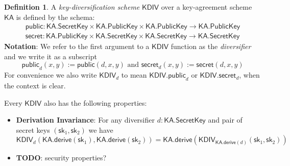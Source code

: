 \documentclass[a4paper]{article}
\newcommand{\TODO}[1]{{\color{red}\textbf{TODO}}: #1}
\theoremstyle{definition}
\newtheorem{definition}{Definition}[subsection]
\newcommand{\KA}{{\textsf{KA}}}
\newcommand{\KDIV}{{\textsf{KDIV}}}
\newcommand{\PublicKey}{{\textsf{PublicKey}}}
\newcommand{\SecretKey}{{\textsf{SecretKey}}}
\newcommand{\derive}{{\textsf{derive}}}
\newcommand{\public}{{\textsf{public}}}
\newcommand{\secret}{{\textsf{secret}}}
\newcommand{\sk}{{\textsf{sk}}}
\begin{document}
\begin{definition}
    A \emph{key-diversification scheme} $\KDIV$ over a key-agreement scheme $\KA$ is defined by the schema:
    \begin{align*}
        \public : \KA.\SecretKey \times \KA.\PublicKey \times \KA.\PublicKey \to \KA.\PublicKey \\
        \secret : \KA.\PublicKey \times \KA.\SecretKey \times \KA.\SecretKey \to \KA.\SecretKey
    \end{align*}
    \textbf{Notation}: We refer to the first argument to a $\KDIV$ function as the \emph{diversifier} and we write it as a subscript
    \[\public_d(x, y) := \public(d, x, y) \,\,\text{and}\,\, \secret_d(x, y) := \secret(d, x, y)\]
    For convenience we also write $\KDIV_d$ to mean $\KDIV.\public_d$ or $\KDIV.\secret_d$, when the context is clear.
    
    Every $\KDIV$ also has the following properties:
    \begin{itemize}
        \item \textbf{Derivation Invariance}: For any diversifier $d : \KA.\SecretKey$ and pair of secret keys $(\sk_1, \sk_2)$ we have
            \[\KDIV_d(\KA.\derive(\sk_1), \KA.\derive(\sk_2)) = \KA.\derive(\KDIV_{\KA.\derive(d)}(\sk_1, \sk_2))\]
        \item \TODO{security properties?}
    \end{itemize}
\end{definition}
\end{document}
